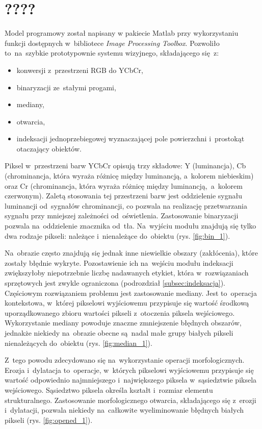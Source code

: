 \section{????}
\label{sec:implementacja_modelu_programowego}
Model programowy został napisany w pakiecie Matlab przy wykorzystaniu funkcji dostępnych w~bibliotece \textit{Image Processing Toolbox}. 
Pozwoliło to~na~szybkie prototypownie systemu wizyjnego, składającego się~z:
\begin{itemize}
	\item konwersji z~przestrzeni RGB do YCbCr,
	\item binaryzacji ze~stałymi progami,
	\item mediany,
	\item otwarcia,
	\item indeksacji jednoprzebiegowej wyznaczającej pole powierzchni i~prostokąt otaczający obiektów.
\end{itemize}

Piksel w~przestrzeni barw YCbCr opisują trzy składowe: Y (luminancja), Cb (chrominancja, która wyraża różnicę między luminancją, a~kolorem niebieskim) oraz Cr (chrominancja, która wyraża różnicę między luminancją,~a~kolorem czerwonym). 
Zaletą stosowania tej przestrzeni barw jest oddzielenie sygnału luminancji od~sygnałów chrominancji, co pozwala na realizację przetwarzania sygnału przy mniejszej zależności od~oświetlenia.
Zastosowanie binaryzacji pozwala na~oddzielenie znacznika od~tła. 
Na~wyjściu modułu znajdują się tylko dwa rodzaje pikseli: należące i~nienależące do~obiektu (rys. \ref{fig:bin_1}).

Na~obrazie często znajdują się jednak inne niewielkie obszary (zakłócenia), które zostały błędnie wykryte. Pozostawienie ich na~wejściu modułu indeksacji zwiększyłoby niepotrzebnie liczbę nadawanych etykiet, która w~rozwiązaniach sprzętowych jest zwykle ograniczona (podrozdział \ref{subsec:indeksacja}).
Częściowym rozwiązaniem problemu jest zastosowanie mediany. 
Jest to~operacja kontekstowa, w~której pikselowi wyjściowemu przypisuje się wartość środkową uporządkowanego zbioru wartości pikseli z~otoczenia piksela wejściowego. 
Wykorzystanie mediany powoduje znaczne zmniejszenie błędnych obszarów, jednakże niekiedy na~obrazie obecne są~nadal małe grupy białych pikseli nienależących do~obiektu (rys. \ref{fig:median_1}).

Z~tego powodu zdecydowano się na~wykorzystanie operacji morfologicznych. 
Erozja i~dylatacja to~operacje, w~których pikselowi wyjściowemu przypisuje się wartość odpowiednio najmniejszego i~największego piksela w~sąsiedztwie piksela wejściowego. 
Sąsiedztwo piksela określa kształt i~rozmiar elementu strukturalnego.  
Zastosowanie morfologicznego otwarcia, składającego się z~erozji i~dylatacji, pozwala niekiedy na~całkowite wyeliminowanie błędnych białych pikseli (rys. \ref{fig:opened_1}).

